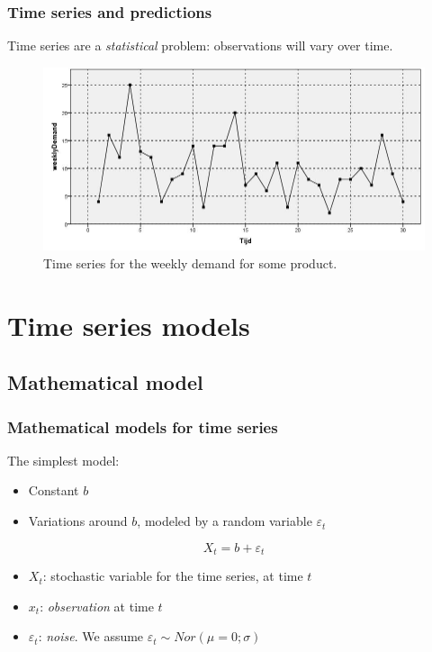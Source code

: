 \documentclass{beamer}
\begin{document}
\begin{frame}
  \frametitle{Time series and predictions}

  Time series are a \emph{statistical} problem: observations will vary over time.
  
  \begin{figure}
    \centering
    \includegraphics[width=\textwidth]{img/tijdreeks11}
    \caption{Time series for the weekly demand for some product.}
  \end{figure}
\end{frame}

\section{Time series models}

\subsection{Mathematical model}

\begin{frame}
  \frametitle{Mathematical models for time series}

  The simplest model:

  \begin{itemize}
    \item Constant $b$
    \item Variations around $b$, modeled by a random variable $\varepsilon_{t}$
  \end{itemize}

  \begin{equation}
    X_{t} = b + \varepsilon_{t}
    \label{eq:timeseries-constant}
  \end{equation}

  \begin{itemize}
    \item $X_{t}$: stochastic variable for the time series, at time $t$
    \item $x_{t}$: \emph{observation} at time $t$
    \item $\varepsilon_{t}$: \emph{noise}. We assume $\varepsilon_{t} \sim Nor(\mu = 0; \sigma)$
  \end{itemize}
\end{frame}
\end{document}
